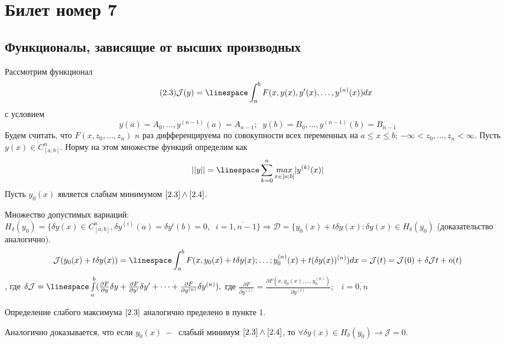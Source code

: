 \documentclass{article}
\begin{document}
\section{Билет номер 7}
\subsection{Функционалы, зависящие от высших производных}
Рассмотрим функционал 
\begin{equation}
    \label{2.3}
    \tag{2.3}
    \mathcal{J}(y)=\linespace \int_a^bF(x,y(x),y'(x),\dots , y^{(n)}(x))d x
\end{equation}
с условием 
\begin{equation}
    \label{2.4}
    \tag{2.4}
    y(a)=A_0,\dots ,y^{(n-1)}(a)=A_{n-1};\;\;y(b)=B_0,\dots , y^{(n-1)}(b)=B_{n-1}
\end{equation}
Будем считать, что $F(x,z_0,\dots , z_n)$ $n$ раз дифференцируема по совокупности всех переменных на $a\leqslant x\leqslant b$; $-\infty < z_0, \dots , z_n< \infty $. Пусть $y(x)\in C^n_{[a;b]}$. Норму на этом множестве функций определим как $$||y||=\linespace\sum_{k=0}^{n}\underset{x \in [a;b]}{max}|y^{(k)}(x)|$$
Пусть $y_0(x)$ является слабым минимумом $\ref{2.3}\wedge \ref{2.4}$.\par
Множество допустимых вариаций: $H_\delta(y_0)=\{ \delta y(x) \in C_{[a;b]}^n, \delta y^{(i)}(a)=\delta y^{i}(b)=0,\;\;i=\overline{1,n-1}\}\Rightarrow \mathcal{D}=\{y_0(x)+t\delta y(x):\delta y(x)\in H_\delta (y_0)$ (доказательство аналогично).
$$\mathcal{J}(y_0(x)+t\delta y(x))=\linespace\int^b_a F(x, y_0(x)+t\delta y(x);\dots ;y_0^{(n)}(x)+t(\delta y(x))^{(n)} )dx =\mathcal{J}(t)=\mathcal{J}(0)+\delta\mathcal{J}t+o(t)$$, где $\delta \mathcal{J}=\linespace\int\limits_a^b(\frac{\partial F}{\partial y}\delta y + \frac{\partial F}{\partial y'}\delta y' +\dots +  \frac{\partial F}{\partial y^{(n)}}\delta y^{(n)} ),$ где $\frac{\partial F}{\partial y^{(i)}}= \frac{\partial F(x,y_0(x),\dots,y_0^{(n)})}{\partial y^{(i)}};\;\;\;i=\overline{0,n}$
\par
Определение слабого максимума $\ref{2.3}$ аналогично пределено в пункте 1.\par
Аналогично доказывается, что если $y_0(x)~-~$ слабый минимум $\ref{2.3}\wedge\ref{2.4}$, то $\forall\delta y(x)\in H_\delta (y_0)\rightarrow \mathcal{J}=0$.
\end{document}
